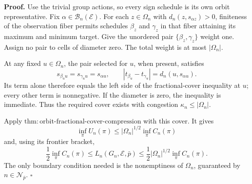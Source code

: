 \textbf{Proof.}
Use the trivial group actions, so every sign schedule is its own orbit representative.  Fix \(\alpha\in\mathcal B_n(\mathcal E)\).  For each \(z\in\Omega_n\) with
\(d_n(z,s_{\alpha z})>0\), finiteness of the observation fiber permits schedules \(\beta_z\) and \(\gamma_z\) in that fiber attaining its maximum and minimum target.  Give the unordered pair \(\{\beta_z,\gamma_z\}\) weight one.  Assign no pair to cells of diameter zero.  The total weight is at most \(|\Omega_n|\).

At any fixed \(u\in\Omega_n\), the pair selected for \(u\), when present, satisfies
\[
 s_{\beta_u u}=s_{\gamma_u u}=s_{\alpha u},
 \qquad
 |t_{\beta_u}-t_{\gamma_u}|
 =d_n(u,s_{\alpha u}).
\]
Its term alone therefore equals the left side of the fractional-cover inequality at \(u\); every other term is nonnegative.  If the diameter is zero, the inequality is immediate.  Thus the required cover exists with congestion \(\kappa_n\le|\Omega_n|\).

Apply \(\mathrm{thm{:}orbit\text{-}fractional\text{-}cover\text{-}compression}\) with this cover.  It gives
\[
 \inf_\pi U_n(\pi)
 \le |\Omega_n|^{1/2}\inf_\pi C_n(\pi)
\]
and, using its frontier bracket,
\[
 \frac12\inf_\pi C_n(\pi)
 \le L_n(G_n,\mathcal E,\bar p)
 \le\frac12|\Omega_n|^{1/2}\inf_\pi C_n(\pi).
\]
The only boundary condition needed is the nonemptiness of \(\Omega_n\), guaranteed by \(n\in\mathcal N_{\bar p}\). \(\square\)